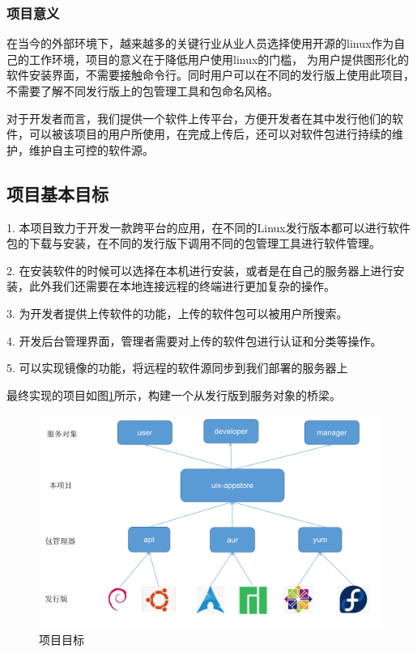 \documentclass[supercite]{Experimental_Report}
\theoremstyle{definition}
\begin{document}
\subsubsection{项目意义}

在当今的外部环境下，越来越多的关键行业从业人员选择使用开源的linux作为自己的工作环境，项目的意义在于降低用户使用linux的门槛，
为用户提供图形化的软件安装界面，不需要接触命令行。同时用户可以在不同的发行版上使用此项目，不需要了解不同发行版上的包管理工具和包命名风格。

对于开发者而言，我们提供一个软件上传平台，方便开发者在其中发行他们的软件，可以被该项目的用户所使用，在完成上传后，还可以对软件包进行持续的维护，维护自主可控的软件源。

\subsection{项目基本目标}

1. 本项目致力于开发一款跨平台的应用，在不同的Linux发行版本都可以进行软件包的下载与安装，在不同的发行版下调用不同的包管理工具进行软件管理。

2. 在安装软件的时候可以选择在本机进行安装，或者是在自己的服务器上进行安装，此外我们还需要在本地连接远程的终端进行更加复杂的操作。

3. 为开发者提供上传软件的功能，上传的软件包可以被用户所搜索。

4. 开发后台管理界面，管理者需要对上传的软件包进行认证和分类等操作。

5. 可以实现镜像的功能，将远程的软件源同步到我们部署的服务器上 



最终实现的项目如图\ref{all}所示，构建一个从发行版到服务对象的桥梁。
\begin{figure}[ht]
    \centering
    \includegraphics[scale=0.5]{./images/all.png}
    \caption{项目目标}
	\label{all}
\end{figure}
\end{document}
